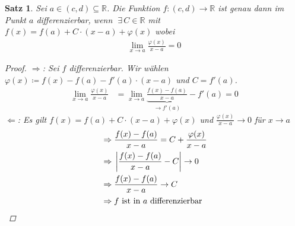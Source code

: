 \documentclass[11pt, twoside, a4paper]{article}
\theoremstyle{plain}
\newtheorem{satz}[blockelement]{Satz}
\newcommand{\pair}[1]{\left(#1\right)}
\newcommand{\of}[1]{\left(#1\right)}
\newcommand{\abs}[1]{\left\lvert#1\right\rvert}
\newcommand{\impl}[0]{\Rightarrow{}}
\newcommand{\fromto}{\rightarrow{}}
\newcommand{\definedas}[0]{\coloneqq}
\newcommand{\sbset}{\subseteq}
\newcommand{\ex}{\;\exists\,}
\newcommand{\anf}[1]{\glqq{}#1\grqq}
\newcommand{\R}{\mathbb{R}}
\begin{document}
    \begin{satz} %
        \label{satz:18-2}
        Sei $a\in\pair{c,d}\sbset\R$. Die Funktion $f: \pair{c,d}\fromto\R$ ist genau dann im Punkt $a$ differenzierbar, wenn $\ex C\in\R$ mit $f(x) = f(a)+C\cdot\pair{x-a} + \varphi\of{x}$ wobei
        \begin{align*}
            \lim_{x\fromto a} \frac{\varphi\of{x}}{x-a} = 0
        \end{align*}
        \begin{proof}
            \anf{$\impl$}: Sei $f$ differenzierbar. Wir wählen $\varphi\of{x} \definedas f(x)-f(a) - f'(a)\cdot\pair{x-a}$ und $C=f'\of{a}$.
            \begin{align*}
                \lim_{x\fromto a} \frac{\varphi\of{x}}{x-a} &= \lim_{x\fromto a} \underbrace{\frac{f(x)-f(a)}{x-a}}_{\fromto f'(a)} - f'(a) = 0
            \end{align*}
            \anf{$\Leftarrow$}: Es gilt $f(x) = f(a)+C\cdot\pair{x-a} + \varphi\of{x}$ und $\frac{\varphi(x)}{x-a}\fromto 0$ für $x\fromto a$
            \begin{align*}
                &\impl \frac{f(x)-f(a)}{x-a} = C + \frac{\varphi(x)}{x-a}\\
                &\impl \abs{\frac{f(x)-f(a)}{x-a} - C} \fromto 0\\
                &\impl \frac{f(x)-f(a)}{x-a}\fromto C\\
                &\impl f \text{ ist in $a$ differenzierbar}\qedhere
            \end{align*}
        \end{proof}
    \end{satz}
\end{document}
